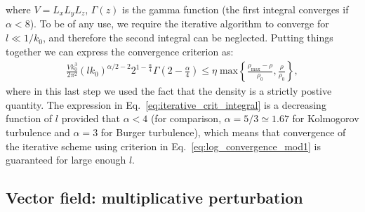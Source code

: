 \documentclass[]{article}
\begin{document}
%
where $V = L_x L_y L_z$, $\Gamma(z)$ is the gamma function (the first integral converges if $\alpha < 8$). To be of any use, we require the iterative algorithm to converge for $l \ll 1/k_0$, and therefore the second integral can be neglected. Putting things together we can express the convergence criterion as:
%
\begin{align}
	\frac{V k_0^3}{2 \pi^2} (lk_0)^{\alpha/2 -2}  2^{1-\frac{\alpha }{4}} \Gamma \left(2-\frac{\alpha }{4}\right)  \leq \eta \; \text{max} \left\lbrace  \frac{ \rho_{\text{max}} -\rho  }{\rho_0} , \frac{ \rho }{\rho_0}  \right\rbrace,
\end{align}
%
where in this last step we used the fact that the density is a strictly postive quantity.
%
The expression in Eq.~\eqref{eq:iterative_crit_integral} is a decreasing function of $l$ provided that $\alpha < 4$ (for comparison, $\alpha = 5/3 \simeq 1.67$ for Kolmogorov turbulence and $\alpha = 3$ for Burger turbulence), which means that convergence of the iterative scheme using criterion in Eq.~\eqref{eq:log_convergence_mod1} is guaranteed for large enough $l$.

\subsection{Vector field: multiplicative perturbation}
\end{document}
